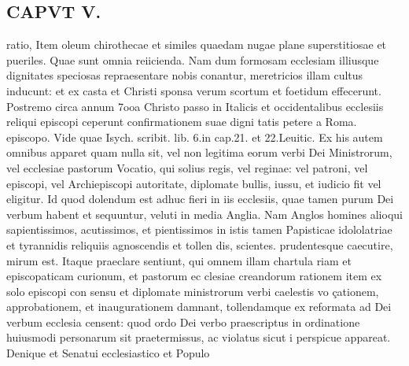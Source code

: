 \documentclass{article}
\begin{document}
\begin{pages}
\section*{CAPVT  V. }
\marginpar{[ p.363 ]}\pstart ratio, Item oleum chirothecae et similes quaedam nugae plane superstitiosae et pueriles. Quae sunt omnia reiicienda. Nam dum formosam ecclesiam illiusque dignitates speciosas repraesentare nobis conantur, meretricios illam cultus inducunt: et ex casta et Christi sponsa verum scortum et foetidum effecerunt. Postremo circa annum 7ooa Christo passo in Italicis et occidentalibus ecclesiis reliqui episcopi ceperunt confirmationem suae digni tatis petere a Roma. episcopo. Vide quae Isych. scribit. lib. 6.in cap.21. et 22.Leuitic. Ex his autem omnibus apparet quam nulla sit, vel non legitima eorum verbi Dei Ministrorum, vel ecclesiae pastorum Vocatio, qui solius regis, vel reginae: vel patroni, vel episcopi, vel Archiepiscopi autoritate, diplomate bullis, iussu, et iudicio fit vel eligitur. Id quod dolendum est adhuc fieri in iis ecclesiis, quae tamen purum Dei verbum habent et sequuntur, veluti in media Anglia. Nam Anglos homines alioqui sapientissimos, acutissimos, et pientissimos in istis tamen Papisticae idololatriae et tyrannidis reliquiis agnoscendis et tollen dis, scientes. prudentesque caecutire, mirum est. Itaque praeclare sentiunt, qui omnem illam chartula riam et episcopaticam curionum, et pastorum ec clesiae creandorum rationem item ex solo episcopi con sensu et diplomate ministrorum verbi caelestis vo çationem, approbationem, et inaugurationem damnant, tollendamque ex reformata ad Dei verbum ecclesia censent: quod ordo Dei verbo praescriptus in ordinatione huiusmodi personarum sit praetermissus, ac violatus sicut i perspicue appareat. Denique et Senatui ecclesiastico et Populo  \pend

\end{pages}
\end{document}
